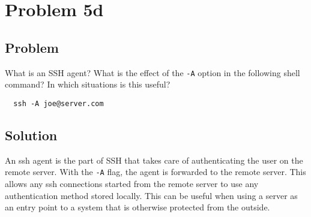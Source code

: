\documentclass[a4paper,10pt]{article}
\begin{document}
\section{Problem 5d}

\subsection{Problem}

What is an SSH agent? What is the effect of the \texttt{-A} option in the following shell command? In which situations is this useful?

\begin{lstlisting}
  ssh -A joe@server.com
\end{lstlisting}

\subsection{Solution}

An ssh agent is the part of SSH that takes care of authenticating the user on the remote server.
With the \texttt{-A} flag, the agent is forwarded to the remote server.
This allows any ssh connections started from the remote server to use any authentication method stored locally.
This can be useful when using a server as an entry point to a system that is otherwise protected from the outside. 
\end{document}
